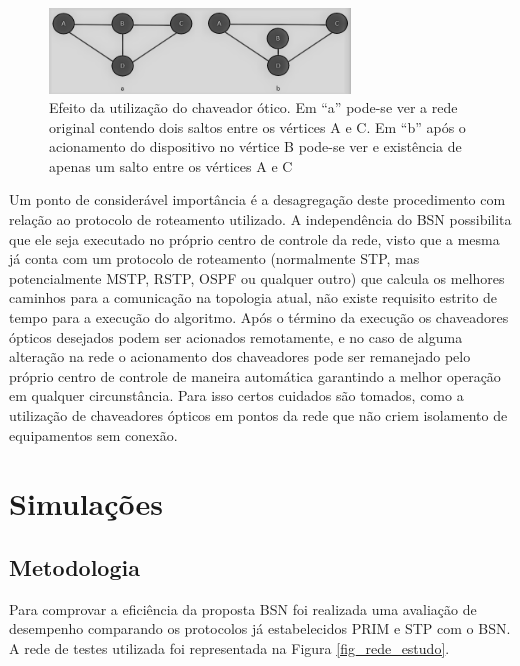 \documentclass[12pt]{article}
\begin{document}
\begin{figure} %
	\centering
	\includegraphics[width=8cm]{Bypass_exemplo_PB}
	\caption{Efeito da utilização do chaveador ótico. Em ``a'' pode-se ver a rede original contendo dois saltos entre os vértices A e C. Em ``b'' após o acionamento do dispositivo no vértice B pode-se ver e existência de apenas um salto entre os vértices A e C}
	\label{fig_bypass_exemplo}
\end{figure}

Um ponto de considerável importância é a desagregação deste procedimento com relação ao protocolo de roteamento utilizado. A independência do BSN possibilita que ele seja executado no próprio centro de controle da rede, visto que a mesma já conta com um protocolo de roteamento (normalmente STP, mas potencialmente MSTP, RSTP, OSPF ou qualquer outro) que calcula os melhores caminhos para a comunicação na topologia atual, não existe requisito estrito de tempo para a execução do algoritmo. Após o término da execução os chaveadores ópticos desejados podem ser acionados remotamente, e no caso de alguma alteração na rede o acionamento dos chaveadores pode ser remanejado pelo próprio centro de controle de maneira automática garantindo a melhor operação em qualquer circunstância. Para isso certos cuidados são tomados, como a utilização de chaveadores ópticos em pontos da rede que não criem isolamento de equipamentos sem conexão.

\section{Simulações}
\label{sec:simulacoes}

\subsection{Metodologia}

Para comprovar a eficiência da proposta BSN foi realizada uma avaliação de desempenho comparando os protocolos já estabelecidos PRIM e STP com o BSN. A rede de testes utilizada foi representada na Figura \ref{fig_rede_estudo}.
\end{document}
